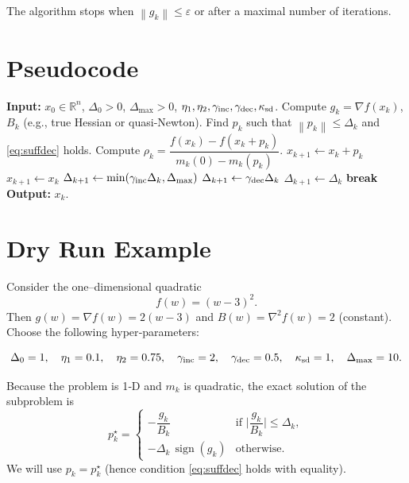 \documentclass[11pt]{article}
\newcommand{\R}{\mathbb{R}}
\newcommand{\norm}[1]{\left\lVert#1\right\rVert}
\begin{document}
The algorithm stops when $\norm{g_{k}}\le\varepsilon$ or after a maximal number of iterations.

\section*{Pseudocode}
\begin{algorithm}[H]
\caption{Trust Region Method with Approximate Subproblem Solution}
\begin{algorithmic}[1]
\STATE \textbf{Input:} $x_{0}\in\R^{n}$, $\Delta_{0}>0$, $\Delta_{\max}>0$,
$\eta_{1},\eta_{2},\gamma_{\rm inc},\gamma_{\rm dec},\kappa_{\rm sd}$.
    \STATE Compute $g_{k}=\nabla f(x_{k})$, $B_{k}$ (e.g., true Hessian or quasi‑Newton).
    \STATE Find $p_{k}$ such that $\norm{p_{k}}\le\Delta_{k}$ and \eqref{eq:suffdec} holds.
    \STATE Compute $\rho_{k}= \dfrac{f(x_{k})-f(x_{k}+p_{k})}{m_{k}(0)-m_{k}(p_{k})}$.
        \STATE $x_{k+1}\gets x_{k}+p_{k}$ 
    \ELSE
        \STATE $x_{k+1}\gets x_{k}$ 
    \ENDIF
        \STATE $\Delta_{k+1}\gets \min(\gamma_{\rm inc}\Delta_{k},\Delta_{\max})$
        \STATE $\Delta_{k+1}\gets \gamma_{\rm dec}\Delta_{k}$
    \ELSE
        \STATE $\Delta_{k+1}\gets \Delta_{k}$
    \ENDIF
    \IF{$\norm{g_{k}}\le\varepsilon$}
        \STATE \textbf{break}
    \ENDIF
\ENDFOR
\STATE \textbf{Output:} $x_{k}$.
\end{algorithmic}
\end{algorithm}
\section*{Dry Run Example}
Consider the one–dimensional quadratic
\[
f(w)=(w-3)^{2}.
\]
Then $g(w)=\nabla f(w)=2(w-3)$ and $B(w)=\nabla^{2}f(w)=2$ (constant).  
Choose the following hyper‑parameters:

\[
\Delta_{0}=1,\quad \eta_{1}=0.1,\quad \eta_{2}=0.75,\quad 
\gamma_{\rm inc}=2,\quad \gamma_{\rm dec}=0.5,\quad 
\kappa_{\rm sd}=1,\quad \Delta_{\max}=10.
\]

Because the problem is 1‑D and $m_{k}$ is quadratic, the exact solution of the subproblem is
\[
p_{k}^{\star}= 
\begin{cases}
-\dfrac{g_{k}}{B_{k}} & \text{if } \bigl|\dfrac{g_{k}}{B_{k}}\bigr|\le\Delta_{k},\\[2mm]
-\Delta_{k}\,\operatorname{sign}(g_{k}) & \text{otherwise.}
\end{cases}
\]
We will use $p_{k}=p_{k}^{\star}$ (hence condition \eqref{eq:suffdec} holds with equality).
\end{document}
